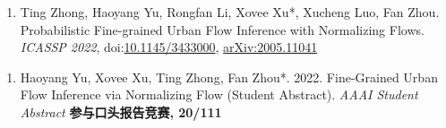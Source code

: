 

\begin{enumerate}[resume]
    \item Ting Zhong, Haoyang Yu, Rongfan Li, Xovee Xu*, Xucheng Luo, Fan Zhou. Probabilistic Fine-grained Urban Flow Inference with Normalizing Flows. \textit{ICASSP 2022}, doi:\href{papers/ICASSP_2022_FUFI.pdf}{10.1145/3433000}, \href{https://arxiv.org/abs/2005.11041}{arXiv:2005.11041}
\end{enumerate}


\begin{enumerate}[resume]
    \item Haoyang Yu, Xovee Xu, Ting Zhong, Fan Zhou*. 2022. Fine-Grained Urban Flow Inference via Normalizing Flow (Student Abstract). \textit{AAAI Student Abstract}
    \newline \textbf{\color{red}参与口头报告竞赛, 20/111}
\end{enumerate}